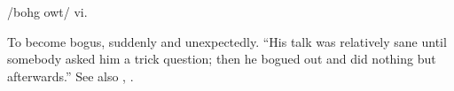  /bohg owt/ vi.

To become bogus, suddenly and unexpectedly. ``His talk was relatively sane until
somebody asked him a trick question; then he bogued out and did nothing but
 afterwards.'' See also ,
.

